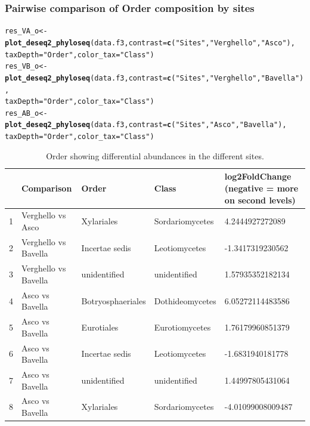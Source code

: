 \documentclass[12pt]{article}\usepackage[]{graphicx}\usepackage[]{color}
\makeatletter
\newcommand{\hlstr}[1]{\textcolor[rgb]{0.192,0.494,0.8}{#1}}%
\newcommand{\hlstd}[1]{\textcolor[rgb]{0.345,0.345,0.345}{#1}}%
\newcommand{\hlkwb}[1]{\textcolor[rgb]{0.69,0.353,0.396}{#1}}%
\newcommand{\hlkwc}[1]{\textcolor[rgb]{0.333,0.667,0.333}{#1}}%
\newcommand{\hlkwd}[1]{\textcolor[rgb]{0.737,0.353,0.396}{\textbf{#1}}}%
\newenvironment{kframe}{%
 \def\at@end@of@kframe{}%
 \ifinner\ifhmode%
  \def\at@end@of@kframe{\end{minipage}}%
  \begin{minipage}{\columnwidth}%
 \fi\fi%
 \def\FrameCommand##1{\hskip\@totalleftmargin \hskip-\fboxsep
 \colorbox{shadecolor}{##1}\hskip-\fboxsep
     \hskip-\linewidth \hskip-\@totalleftmargin \hskip\columnwidth}%
 \MakeFramed {\advance\hsize-\width
   \@totalleftmargin\z@ \linewidth\hsize
   \@setminipage}}%
 {\par\unskip\endMakeFramed%
 \at@end@of@kframe}
\newenvironment{knitrout}{}{} %
\numberwithin{figure}{section}
\makeatother
\begin{document}
    \subsubsection{Pairwise comparison of Order composition by sites}

\begin{knitrout}\small
{}\color{fgcolor}\begin{kframe}
\begin{alltt}
\hlstd{res_VA_o} \hlkwb{<-} \hlkwd{plot_deseq2_phyloseq}\hlstd{(data.f3,} \hlkwc{contrast} \hlstd{=} \hlkwd{c}\hlstd{(}\hlstr{"Sites"}\hlstd{,} \hlstr{"Verghello"}\hlstd{,} \hlstr{"Asco"}\hlstd{),}
                               \hlkwc{taxDepth} \hlstd{=} \hlstr{"Order"}\hlstd{,} \hlkwc{color_tax} \hlstd{=} \hlstr{"Class"}\hlstd{)}
\hlstd{res_VB_o} \hlkwb{<-} \hlkwd{plot_deseq2_phyloseq}\hlstd{(data.f3,} \hlkwc{contrast} \hlstd{=} \hlkwd{c}\hlstd{(}\hlstr{"Sites"}\hlstd{,} \hlstr{"Verghello"}\hlstd{,} \hlstr{"Bavella"}\hlstd{),}
                               \hlkwc{taxDepth} \hlstd{=} \hlstr{"Order"}\hlstd{,} \hlkwc{color_tax} \hlstd{=} \hlstr{"Class"}\hlstd{)}
\hlstd{res_AB_o} \hlkwb{<-} \hlkwd{plot_deseq2_phyloseq}\hlstd{(data.f3,} \hlkwc{contrast} \hlstd{=} \hlkwd{c}\hlstd{(}\hlstr{"Sites"}\hlstd{,} \hlstr{"Asco"}\hlstd{,} \hlstr{"Bavella"}\hlstd{),}
                               \hlkwc{taxDepth} \hlstd{=} \hlstr{"Order"}\hlstd{,} \hlkwc{color_tax} \hlstd{=} \hlstr{"Class"}\hlstd{)}
\end{alltt}
\end{kframe}
\end{knitrout}

\begin{table}[ht]
\centering
\begingroup\tiny
\begin{tabular}{lllll}
  \hline
 & Comparison & Order & Class & log2FoldChange 
 (negative = more on second levels) \\ 
  \hline
1 & Verghello vs Asco & Xylariales & Sordariomycetes & 4.2444927272089 \\ 
  2 & Verghello vs Bavella & Incertae sedis & Leotiomycetes & -1.3417319230562 \\ 
  3 & Verghello vs Bavella & unidentified & unidentified & 1.57935352182134 \\ 
  4 & Asco vs Bavella & Botryosphaeriales & Dothideomycetes & 6.05272114483586 \\ 
  5 & Asco vs Bavella & Eurotiales & Eurotiomycetes & 1.76179960851379 \\ 
  6 & Asco vs Bavella & Incertae sedis & Leotiomycetes & -1.6831940181778 \\ 
  7 & Asco vs Bavella & unidentified & unidentified & 1.44997805431064 \\ 
  8 & Asco vs Bavella & Xylariales & Sordariomycetes & -4.01099008009487 \\ 
   \hline
\end{tabular}
\endgroup
\caption{Order showing differential abundances in the different sites.} 
\end{table}


\cleardoublepage
\listoffigures
\listoftables
\end{document}
